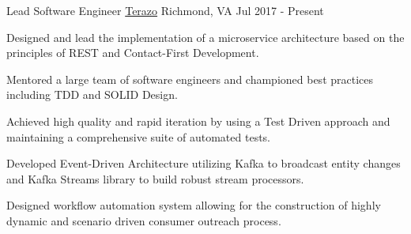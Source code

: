 
\begin{cventries}

  \cventry
  {Lead Software Engineer} %
  {\href{https://terazo.com}{Terazo}} %
  {Richmond, VA} %
  {Jul 2017 - Present} %
  {
    \begin{cvitems} %
      \item {Designed and lead the implementation of a microservice architecture
      based on the principles of REST and Contact-First Development.}
      \item {Mentored a large team of software engineers and championed best
      practices including TDD and SOLID Design.}
      \item {Achieved high quality and rapid iteration by using a Test
      Driven approach and maintaining a comprehensive suite of automated tests.}
      \item {Developed Event-Driven Architecture utilizing Kafka to broadcast
      entity changes and Kafka Streams library to build robust stream
      processors.}
      \item {Designed workflow automation system allowing for the construction
      of highly dynamic and scenario driven consumer outreach process.}
    \end{cvitems}
  }


\end{cventries}
